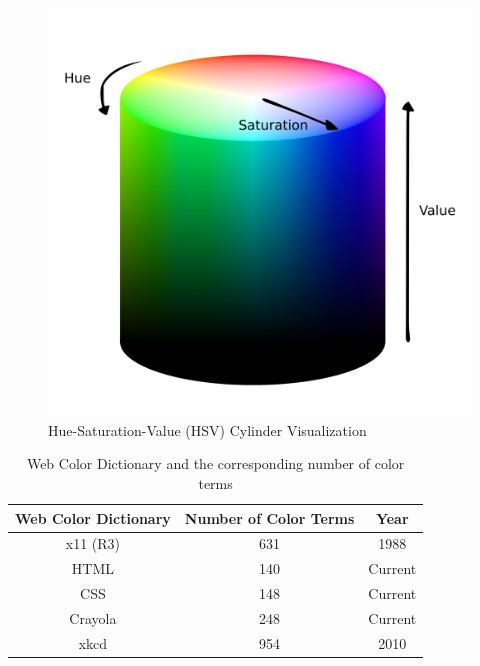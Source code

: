 \begin{figure}[hbt!]\centering
\includegraphics[width=.5\textwidth]{image/general/HSV.png}
\caption{Hue-Saturation-Value (HSV) Cylinder Visualization}
\label{fig:hsvcylinder}
\end{figure}

\begin{table}[]
\centering
\begin{tabular}{|c|c|c|}
\hline
\multicolumn{1}{|c|}{\textbf{Web Color Dictionary}} & \multicolumn{1}{c|}{\textbf{Number of Color Terms}} & \multicolumn{1}{c|}{\textbf{Year}} \\ \hline
x11 (R3)                                            & 631                                                 & 1988                               \\ \hline
HTML                                                & 140                                                 & Current                            \\ \hline
CSS                                                 & 148                                                 & Current                            \\ \hline
Crayola                                             & 248                                                 & Current                            \\ \hline
xkcd                                                & 954                                                 & 2010                               \\ \hline
\end{tabular}
\caption{Web Color Dictionary and the corresponding number of color terms}
\label{table:allcolorterms}
\end{table}



